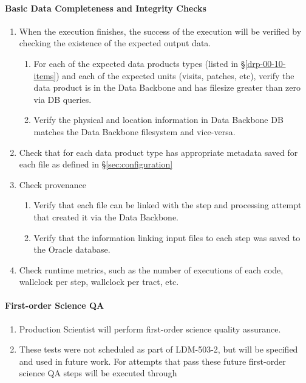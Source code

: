 \paragraph{Basic Data Completeness and Integrity Checks}\label{sec:basic_checks}
\begin{enumerate}
  \item{When the execution finishes, the success of the execution will be verified by checking the existence of the expected output data.}
    \begin{enumerate}

       \item{For each of the expected data products types (listed
       in \S\ref{drp-00-10-items}) and each of the expected units
       (visits, patches, etc), verify the data product is in the 
       Data Backbone and has filesize greater than zero via DB 
       queries.}

       \item{Verify the physical and location information in Data
       Backbone DB matches the Data Backbone filesystem and
       vice-versa.}

    \end{enumerate}
  \item{Check that for each data product type has appropriate metadata saved for each file as defined in \S\ref{sec:configuration}}
  \item{Check provenance}
    \begin{enumerate}
        \item{Verify that each file can be linked with the step and processing attempt that created it via the Data Backbone.}
        \item{Verify that the information linking input files to each step was saved to the Oracle database.}
    \end{enumerate}
  \item{Check runtime metrics, such as the number of executions of each code, wallclock per step, wallclock per tract,
        etc.}
\end{enumerate}

\paragraph{First-order Science QA}\label{sec:first-order-qa}
\begin{enumerate}
  \item{Production Scientist will perform first-order science quality assurance.}
  \item{These tests were not scheduled as part of LDM-503-2, but will be specified and used in future work.
  For attempts that pass these future first-order science QA steps will be executed through }
\end{enumerate}
